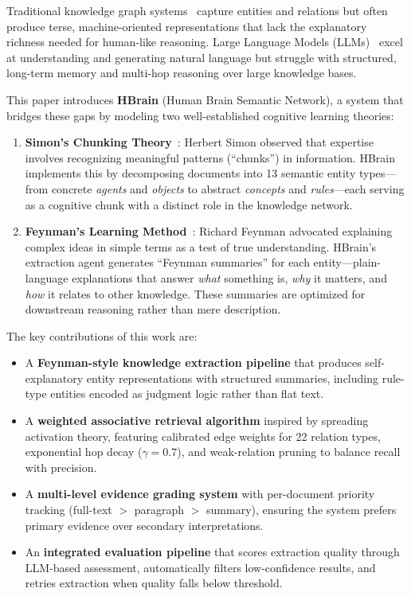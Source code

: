 \documentclass[11pt]{article}
\begin{document}
Traditional knowledge graph systems~\cite{hogan2021knowledge} capture entities and relations but often produce terse, machine-oriented representations that lack the explanatory richness needed for human-like reasoning. Large Language Models (LLMs)~\cite{brown2020language} excel at understanding and generating natural language but struggle with structured, long-term memory and multi-hop reasoning over large knowledge bases.

This paper introduces \textbf{HBrain} (Human Brain Semantic Network), a system that bridges these gaps by modeling two well-established cognitive learning theories:

\begin{enumerate}
    \item \textbf{Simon's Chunking Theory}~\cite{simon1974chunk}: Herbert Simon observed that expertise involves recognizing meaningful patterns (``chunks'') in information. HBrain implements this by decomposing documents into 13 semantic entity types---from concrete \textit{agents} and \textit{objects} to abstract \textit{concepts} and \textit{rules}---each serving as a cognitive chunk with a distinct role in the knowledge network.

    \item \textbf{Feynman's Learning Method}~\cite{feynman1988pleasure}: Richard Feynman advocated explaining complex ideas in simple terms as a test of true understanding. HBrain's extraction agent generates ``Feynman summaries'' for each entity---plain-language explanations that answer \textit{what} something is, \textit{why} it matters, and \textit{how} it relates to other knowledge. These summaries are optimized for downstream reasoning rather than mere description.
\end{enumerate}

The key contributions of this work are:

\begin{itemize}
    \item A \textbf{Feynman-style knowledge extraction pipeline} that produces self-explanatory entity representations with structured summaries, including rule-type entities encoded as judgment logic rather than flat text.

    \item A \textbf{weighted associative retrieval algorithm} inspired by spreading activation theory, featuring calibrated edge weights for 22 relation types, exponential hop decay ($\gamma = 0.7$), and weak-relation pruning to balance recall with precision.

    \item A \textbf{multi-level evidence grading system} with per-document priority tracking (full-text $>$ paragraph $>$ summary), ensuring the system prefers primary evidence over secondary interpretations.

    \item An \textbf{integrated evaluation pipeline} that scores extraction quality through LLM-based assessment, automatically filters low-confidence results, and retries extraction when quality falls below threshold.
\end{itemize}
\end{document}
